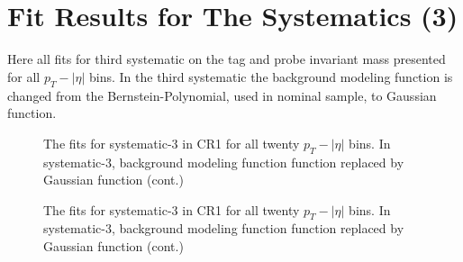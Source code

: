 
\chapter{Fit Results for The Systematics (3)} %

\label{AppendixD} %

Here all fits for third systematic on the tag and probe invariant mass presented for all $p_T-|\eta|$ bins. In the third systematic the background modeling function is changed from the Bernstein-Polynomial, used in nominal sample, to Gaussian function.

\begin{figure}[H]
\begin{center}
\scalebox{0.35}{}\scalebox{0.35}{}
\scalebox{0.35}{}\scalebox{0.35}{}
\caption{The fits for systematic-3 in CR1 for all twenty $p_T-|\eta|$ bins. In systematic-3, background modeling function function replaced by Gaussian function (cont.)}
\label{fig:fit_cr1_sys3}
\end{center}
\end{figure}

\begin{figure}[H]
\begin{center}
\scalebox{0.35}{}\scalebox{0.35}{}
\scalebox{0.35}{}\scalebox{0.35}{}
\scalebox{0.35}{}\scalebox{0.35}{}
\scalebox{0.35}{}\scalebox{0.35}{}
\caption{The fits for systematic-3 in CR1 for all twenty $p_T-|\eta|$ bins. In systematic-3, background modeling function function replaced by Gaussian function (cont.)}
\label{fig:fit_cr1_sys3}
\end{center}
\end{figure}

